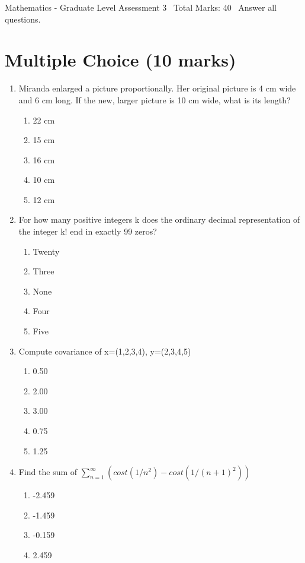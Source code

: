 \documentclass[12pt]{article}
\begin{document}
\begin{center}
Mathematics - Graduate Level Assessment 3 \
Total Marks: 40 \
Answer all questions.
\end{center}

\section*{Multiple Choice (10 marks)}
\begin{enumerate}[label=\arabic*.]
\item Miranda enlarged a picture proportionally. Her original picture is 4 cm wide and 6 cm
long. If the new, larger picture is 10 cm wide, what is its length?
\begin{enumerate}[label=(\alph*)]
    \item 22 cm
    \item 15 cm
    \item 16 cm
    \item 10 cm
    \item 12 cm
\end{enumerate}
\item For how many positive integers k does the ordinary decimal representation of the integer
k! end in exactly 99 zeros?
\begin{enumerate}[label=(\alph*)]
    \item Twenty
    \item Three
    \item None
    \item Four
    \item Five
\end{enumerate}
\item Compute covariance of x=(1,2,3,4), y=(2,3,4,5)
\begin{enumerate}[label=(\alph*)]
    \item 0.50
    \item 2.00
    \item 3.00
    \item 0.75
    \item 1.25
\end{enumerate}
\item Find the sum of $\sum_{n=1}^{\infty} (cost(1/n^2) - cost(1/(n+1)^2))$
\begin{enumerate}[label=(\alph*)]
    \item -2.459
    \item -1.459
    \item -0.159
    \item 2.459

\end{enumerate}
\end{enumerate}
\end{document}
